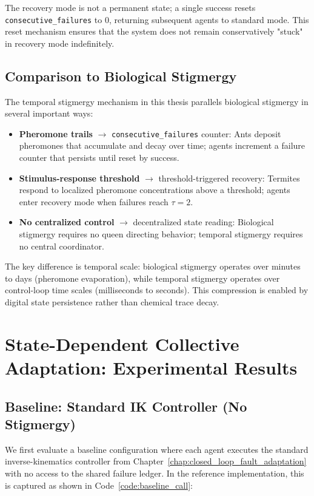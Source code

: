 \documentclass[12pt,a4paper,oneside]{report}
\begin{document}
The recovery mode is not a permanent state; a single success resets \texttt{consecutive\_failures} to 0, returning subsequent agents to standard mode. This reset mechanism ensures that the system does not remain conservatively "stuck" in recovery mode indefinitely.

\subsection{Comparison to Biological Stigmergy}
\label{subsec:comparison_to_biological_stigmergy}

The temporal stigmergy mechanism in this thesis parallels biological stigmergy in several important ways:

\begin{itemize}
    \item \textbf{Pheromone trails} $\rightarrow$ \texttt{consecutive\_failures} counter: Ants deposit pheromones that accumulate and decay over time; agents increment a failure counter that persists until reset by success.
    \item \textbf{Stimulus-response threshold} $\rightarrow$ threshold-triggered recovery: Termites respond to localized pheromone concentrations above a threshold; agents enter recovery mode when failures reach $\tau = 2$.
    \item \textbf{No centralized control} $\rightarrow$ decentralized state reading: Biological stigmergy requires no queen directing behavior; temporal stigmergy requires no central coordinator.
\end{itemize}

The key difference is temporal scale: biological stigmergy operates over minutes to days (pheromone evaporation), while temporal stigmergy operates over control-loop time scales (milliseconds to seconds). This compression is enabled by digital state persistence rather than chemical trace decay.

\section{State-Dependent Collective Adaptation: Experimental Results}

\subsection{Baseline: Standard IK Controller (No Stigmergy)}
\label{subsec:baseline_standard_ik_controller_no_stigmergy}

We first evaluate a baseline configuration where each agent executes the standard inverse-kinematics controller from Chapter~\ref{chap:closed_loop_fault_adaptation} with no access to the shared failure ledger. In the reference implementation, this is captured as shown in Code~\ref{code:baseline_call}:
\end{document}
